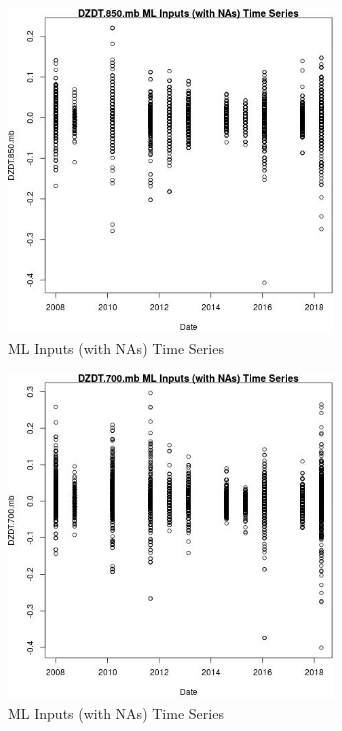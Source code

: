 \begin{figure} 
\centering  
\includegraphics[width=0.77\textwidth]{Code_Outputs/Report_ML_input_PM25_Step4_part_e_de_duplicated_aves_compiled_2019-05-18wNAs_DZDT850mbvDate.jpg} 
\caption{\label{fig:Report_ML_input_PM25_Step4_part_e_de_duplicated_aves_compiled_2019-05-18wNAsDZDT850mbvDate}ML Inputs (with NAs) Time Series} 
\end{figure} 
 

\begin{figure} 
\centering  
\includegraphics[width=0.77\textwidth]{Code_Outputs/Report_ML_input_PM25_Step4_part_e_de_duplicated_aves_compiled_2019-05-18wNAs_DZDT700mbvDate.jpg} 
\caption{\label{fig:Report_ML_input_PM25_Step4_part_e_de_duplicated_aves_compiled_2019-05-18wNAsDZDT700mbvDate}ML Inputs (with NAs) Time Series} 
\end{figure} 
 

